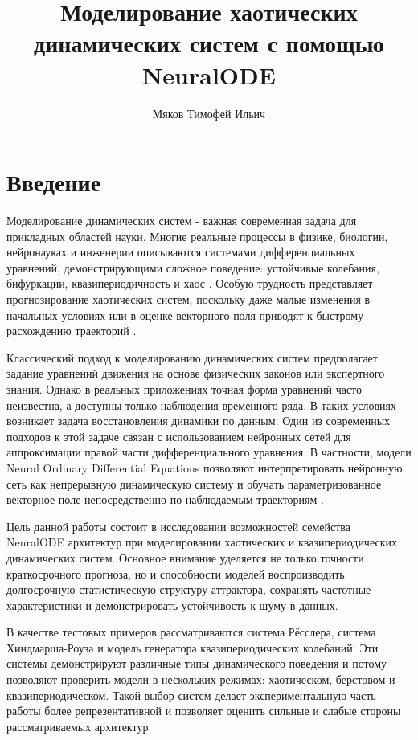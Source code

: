 \documentclass[PMI,VKR]{HSEUniversity}
\title{Моделирование хаотических динамических систем с помощью NeuralODE}
\author{Мяков Тимофей Ильич}
\begin{document}
\maketitle


\chapter{Введение}

Моделирование динамических систем - важная современная задача для прикладных областей науки. 
Многие реальные процессы в физике, биологии,
нейронауках и инженерии описываются системами дифференциальных
уравнений, демонстрирующими сложное поведение: устойчивые колебания,
бифуркации, квазипериодичность и хаос \cite{strogatz2018nonlinear, ott2002chaos}.
Особую трудность представляет прогнозирование хаотических систем,
поскольку даже малые изменения в начальных условиях или в оценке
векторного поля приводят к быстрому расхождению траекторий
\cite{kantz2004nonlinear}.

Классический подход к моделированию динамических систем предполагает
задание уравнений движения на основе физических законов или
экспертного знания. Однако в реальных приложениях точная форма
уравнений часто неизвестна, а доступны только наблюдения временного
ряда. В таких условиях возникает задача восстановления динамики по
данным. Один из современных подходов к этой задаче связан с
использованием нейронных сетей для аппроксимации правой части
дифференциального уравнения. В частности, модели Neural Ordinary
Differential Equations позволяют интерпретировать нейронную сеть как
непрерывную динамическую систему и обучать параметризованное векторное
поле непосредственно по наблюдаемым траекториям
\cite{chen2019neuralordinarydifferentialequations}.

Цель данной работы состоит в исследовании возможностей семейства NeuralODE
архитектур при моделировании хаотических и квазипериодических
динамических систем. Основное внимание уделяется не только
точности краткосрочного прогноза, но и способности моделей
воспроизводить долгосрочную статистическую структуру аттрактора,
сохранять частотные характеристики и демонстрировать устойчивость к
шуму в данных.

В качестве тестовых примеров рассматриваются система Рёсслера,
система Хиндмарша-Роуза и модель генератора квазипериодических колебаний. Эти системы
демонстрируют различные типы динамического поведения и потому позволяют
проверить модели в нескольких режимах: хаотическом, берстовом и
квазипериодическом. Такой выбор систем делает экспериментальную часть
работы более репрезентативной и позволяет оценить сильные и слабые
стороны рассматриваемых архитектур.
\end{document}
